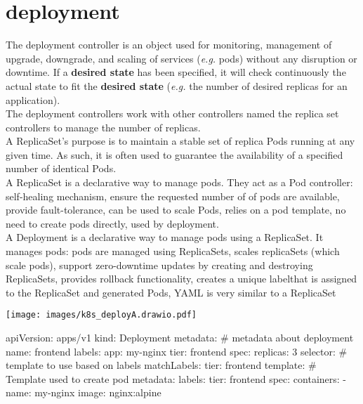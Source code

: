 \documentclass{refcard}
\begin{document}
\section{deployment}

The deployment controller is an object used for monitoring, management of upgrade, downgrade, and scaling of services (\textit{e.g.} pods) without any disruption or downtime. If a \textbf{desired state} has been specified, it will check continuously the actual state to fit the \textbf{desired state} (\textit{e.g.} the number of desired replicas for an application).\\

The deployment controllers work with other controllers named the replica set controllers to manage the number of replicas.\\

A ReplicaSet's purpose is to maintain a stable set of replica Pods running at any given time. As such, it is often used to guarantee the availability of a specified number of identical Pods.\\

A ReplicaSet is a declarative way to manage pods. They act as a Pod controller: self-healing mechanism, ensure the requested number of of pods are available, provide fault-tolerance, can be used to scale Pods, relies on a pod template, no need to create pods directly, used by deployment.\\

A Deployment is a declarative way to manage pods using a ReplicaSet. It manages pods: pods are managed using ReplicaSets, scales replicaSets (which scale pods), support zero-downtime updates by creating and destroying ReplicaSets, provides rollback functionality, creates a unique labelthat is assigned to the ReplicaSet and generated Pods, YAML is very similar to a ReplicaSet\\


\begin{center}
    \texttt{[image: images/k8s\_deployA.drawio.pdf]}
\end{center}

\begin{yamlbox}[title={file.deploy.yml}]
apiVersion: apps/v1
kind: Deployment
metadata: # metadata about deployment
  name: frontend
  labels:
    app: my-nginx
    tier: frontend
spec:
  replicas: 3
  selector: # template to use based on labels
    matchLabels:
      tier: frontend
  template: # Template used to create pod
    metadata:
      labels:
        tier: frontend
    spec:
      containers:
      - name: my-nginx
        image: nginx:alpine
\end{yamlbox}
\end{document}
